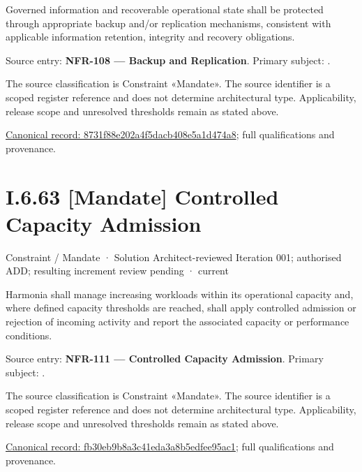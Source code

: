 Governed information and recoverable operational state shall be protected through appropriate backup and/or replication mechanisms, consistent with applicable information retention, integrity and recovery obligations.



Source entry: \textbf{NFR-108 — Backup and Replication}. Primary subject: \texttt{}.



The source classification is Constraint «Mandate». The source identifier is a scoped register reference and does not determine architectural type. Applicability, release scope and unresolved thresholds remain as stated above.


{\footnotesize \href{../../../../continuum/motivation/constraint/mandate/8731f88e202a4f5dacb408e5a1d474a8.md}{Canonical record: 8731f88e202a4f5dacb408e5a1d474a8}; full qualifications and provenance.}\par
\section*{I.6.63 [Mandate] Controlled Capacity Admission}
\label{navigation:I.6.63}

\label{element:fb30eb9b8a3c41eda3a8b5edfee95ac1}
{\small Constraint / Mandate · Solution Architect-reviewed Iteration 001; authorised ADD; resulting increment review pending · current}\par

Harmonia shall manage increasing workloads within its operational capacity and, where defined capacity thresholds are reached, shall apply controlled admission or rejection of incoming activity and report the associated capacity or performance conditions.



Source entry: \textbf{NFR-111 — Controlled Capacity Admission}. Primary subject: \texttt{}.



The source classification is Constraint «Mandate». The source identifier is a scoped register reference and does not determine architectural type. Applicability, release scope and unresolved thresholds remain as stated above.


{\footnotesize \href{../../../../continuum/motivation/constraint/mandate/fb30eb9b8a3c41eda3a8b5edfee95ac1.md}{Canonical record: fb30eb9b8a3c41eda3a8b5edfee95ac1}; full qualifications and provenance.}\par

